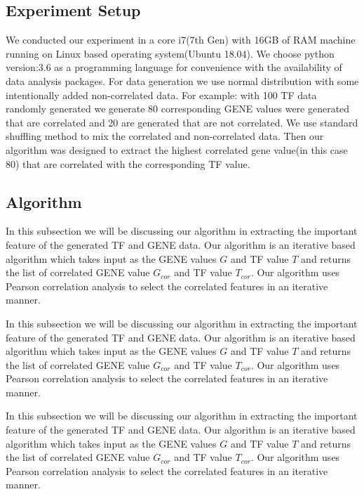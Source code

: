 \subsection{Experiment Setup}
We conducted our experiment in a core i7(7th Gen) with 16GB of RAM machine running on Linux based operating system(Ubuntu 18.04). We choose python version:3.6 as a programming language for convenience with the availability of data analysis packages. For data generation we use normal distribution with some intentionally added non-correlated data. For example: with 100 TF data randomly generated we generate 80 corresponding GENE values were generated that are correlated and 20 are generated that are not correlated. We use standard shuffling method to mix the correlated and non-correlated data. Then our algorithm was designed to extract the highest correlated gene value(in this case 80) that are correlated with the corresponding TF value.

\subsection{Algorithm}
In this subsection we will be discussing our algorithm in extracting the important feature of the generated TF and GENE data. Our algorithm is an iterative based algorithm which takes input as the GENE values $G$ and TF value $T$ and returns the list of correlated GENE value $G_{cor}$ and TF value $T_{cor}$. Our algorithm uses Pearson correlation analysis to select the correlated features in an iterative manner.

In this subsection we will be discussing our algorithm in extracting the important feature of the generated TF and GENE data. Our algorithm is an iterative based algorithm which takes input as the GENE values $G$ and TF value $T$ and returns the list of correlated GENE value $G_{cor}$ and TF value $T_{cor}$. Our algorithm uses Pearson correlation analysis to select the correlated features in an iterative manner.

In this subsection we will be discussing our algorithm in extracting the important feature of the generated TF and GENE data. Our algorithm is an iterative based algorithm which takes input as the GENE values $G$ and TF value $T$ and returns the list of correlated GENE value $G_{cor}$ and TF value $T_{cor}$. Our algorithm uses Pearson correlation analysis to select the correlated features in an iterative manner.


